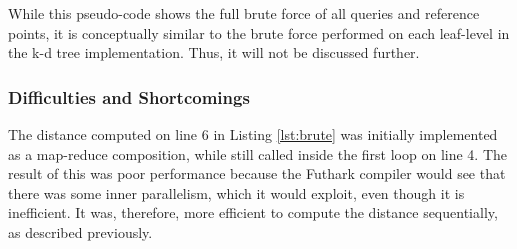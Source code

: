 While this pseudo-code shows the full brute force of all queries and reference points, it is conceptually similar to the brute force performed on each leaf-level in the k-d tree implementation. Thus, it will not be discussed further.


\subsubsection{Difficulties and Shortcomings}

The distance computed on line 6 in Listing \ref{lst:brute} was initially implemented as a map-reduce composition, while still called inside the first loop on line 4. The result of this was poor performance because the Futhark compiler would see that there was some inner parallelism, which it would exploit, even though it is inefficient. It was, therefore, more efficient to compute the distance sequentially, as described previously. 


























